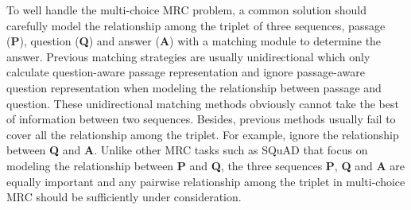 \documentclass[11pt,a4paper]{article}
\begin{document}
	To well handle the multi-choice MRC problem, a common solution should carefully model the relationship among the triplet of three sequences, passage (\textbf{P}), question (\textbf{Q}) and answer (\textbf{A}) with a matching module to determine the answer. Previous matching strategies \cite{Wang-2018, tang2019multi, Chen2018ConvolutionalSA, ocn} are usually unidirectional which only calculate question-aware passage representation and ignore passage-aware question representation when modeling the relationship between passage and question. These unidirectional matching methods obviously cannot take the best of information between two sequences. Besides, previous methods usually fail to cover all the relationship among the triplet. For example, \cite{Wang-2018} ignore the relationship between \textbf{Q} and \textbf{A}. Unlike other MRC tasks such as SQuAD that focus on modeling the relationship between \textbf{P} and \textbf{Q}, the three sequences \textbf{P}, \textbf{Q} and \textbf{A} are equally important and any pairwise relationship among the triplet in multi-choice MRC should be sufficiently under consideration.   
	
\end{document}

